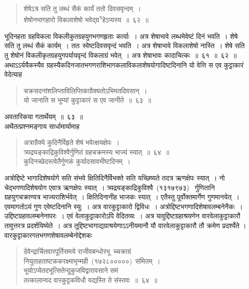 \documentclass[11pt, openany]{book}
\begin{document}
\newpage
\thispagestyle{fancy}
\fancyhf{}
\begin{quote}
{\ks शेषेऽत्र सति तु लब्धं सैकं कार्यं ततो दिवसवृन्दम्~।\\
शेषोनभागहारो विकलाशेषो भवेद्ग्र\textsuperscript{१}हेऽप्यस्य~॥~६२~॥}
\end{quote}
\indent
भूदिनहता ग्रहविकला विकलीकुतग्रहयुगभगणहृताः कार्याः~। अत्र
शेषाभावे लब्धमेवेष्टं दिनं भवति~। शेषे सति तु लब्धं सैकं कार्यम्~। ततः
स्वेष्टदिवसवृन्दं भवति~। अत्र शेषाभावे विकलाशेषो नास्ति~। शेषे सति तु
शेषोनं विकलीकृतग्रहयुगपर्यायवृन्दं विकलाग्रं भवेत्~। अत्र शेषाभावः कादाचित्कः~॥~६१~॥~६२~॥\\
\indent
अथाऽऽर्ययैकस्यैव ग्रहस्यैकदिनजातभगणराशिभागकलाविकलाशेषयोगादिष्टदिनानि यो वेत्ति स एव कुट्टाकारं वेदेत्याह\textendash
\begin{quote}
{\ks चक्रसदनांशलिप्ताविलिप्तिकाग्रैक्यतोऽभिमतदिवसान्~।\\
यो जानाति स भूम्यां कुट्टाकारं स एव जानीते~॥~६३~॥}
\end{quote}
\indent
अवतारिकया गतार्थेयम्~॥~६३~॥\\
\indent
अथैतत्प्रश्नमङ्गाय सार्धामार्यामाह\textendash
\begin{quote}
{\ks अत्राग्रैक्ये कुदिनैर्विहृते शेषं भवेत्क्षयक्षेपः~।\\
त्र्यद्र्यङ्काद्रिकुविश्वैर्गुणितं ग्रहचक्रमस्य भाज्यं स्यात्~॥~६४~॥\\
कुदिनच्छेदस्त्वेतैर्गुणकं कुर्यादसावभीष्टदिनम्~।}
\end{quote}
\indent
अत्रोद्दिष्टे भागादिशेषयोगे सति संभवे क्षितिदिनैर्विभक्ते सति यच्छिष्यते तदत्र ऋणक्षेपः स्यात्~। नो चेद्भगणादिशेषयोग एवात्र ऋणक्षेपः स्यात्~। त्र्यद्र्यङ्काद्रिकुविश्वै~(१३१७९७३)~ र्गुणितानि ग्रहयुगचक्राण्यत्र भाज्यराशिर्भवेत्~। क्षितिदिनानीह भाजकः स्यात्~। एतैस्तु पूर्वोक्तमार्गेण गुणमानयेत्~। एवमागतोऽयं गुण एवेष्टदिनानि स्युः~। अत्र वारकुट्टाकारो द्विविधः~। अत्रोद्दिष्टभगणादिशेषावलम्बनेनैकः~।उद्दिष्टग्रहावलम्बनेनापरः~। एवं वेलाकुट्टाकारोऽपि वेदितव्यः~। अत्र यावुद्दिष्टग्रहाश्रयणेन
वारवेलाकुट्टाकारौ तावुत्तरत्र प्रदर्शयिष्येते~। अत्र तूद्दिष्टभागाद्यग्राश्रयेणाऽऽनीयमानौ
यौ वारवेलाकुट्टाकारौ तौ क्रमेण प्रदर्श्येते । वारकुट्टाकारगतभगणशेषावलम्बेनोद्देशकः\textendash
\begin{quote}
{\ks देवेन्द्रार्चितवारपूर्तिसमये राजीवबन्धोरभू\textendash\
च्चक्राग्रं नियुताहताष्टककरक्ष्माभृन्मही~(१७२८०००००)~संमितम्~।\\
भूयोऽप्येतदभूत्सितेन्दुकुजविद्वारावसाने समं\\
तत्कालान्वद वारकुट्टकविधौ यद्यस्ति ते संस्तवः~॥~६४~॥}
\end{quote}
\end{document}
